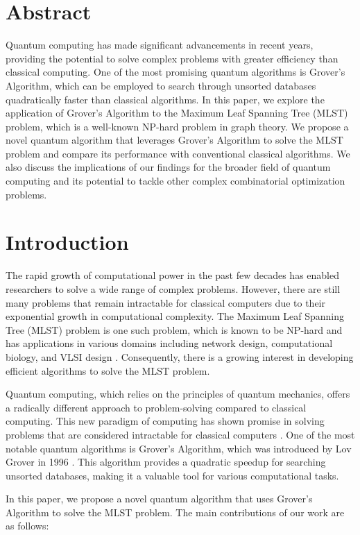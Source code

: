 \section{Abstract}
Quantum computing has made significant advancements in recent years, providing the potential to solve complex problems with greater efficiency than classical computing. One of the most promising quantum algorithms is Grover's Algorithm, which can be employed to search through unsorted databases quadratically faster than classical algorithms. In this paper, we explore the application of Grover's Algorithm to the Maximum Leaf Spanning Tree (MLST) problem, which is a well-known NP-hard problem in graph theory. We propose a novel quantum algorithm that leverages Grover's Algorithm to solve the MLST problem and compare its performance with conventional classical algorithms. We also discuss the implications of our findings for the broader field of quantum computing and its potential to tackle other complex combinatorial optimization problems.

\section{Introduction}
The rapid growth of computational power in the past few decades has enabled researchers to solve a wide range of complex problems. However, there are still many problems that remain intractable for classical computers due to their exponential growth in computational complexity. The Maximum Leaf Spanning Tree (MLST) problem is one such problem, which is known to be NP-hard and has applications in various domains including network design, computational biology, and VLSI design \cite{1}. Consequently, there is a growing interest in developing efficient algorithms to solve the MLST problem.

Quantum computing, which relies on the principles of quantum mechanics, offers a radically different approach to problem-solving compared to classical computing. This new paradigm of computing has shown promise in solving problems that are considered intractable for classical computers \cite{2}. One of the most notable quantum algorithms is Grover's Algorithm, which was introduced by Lov Grover in 1996 \cite{3}. This algorithm provides a quadratic speedup for searching unsorted databases, making it a valuable tool for various computational tasks.

In this paper, we propose a novel quantum algorithm that uses Grover's Algorithm to solve the MLST problem. The main contributions of our work are as follows:

